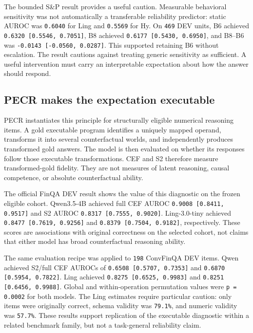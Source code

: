 \documentclass[11pt]{article}
\begin{document}
The bounded S\&P result provides a useful caution. Measurable behavioral sensitivity was not automatically a transferable reliability predictor: static AUROC was \texttt{0.6040} for Ling and \texttt{0.5569} for Hy. On \texttt{469} DEV units, B6 achieved \texttt{0.6320 [0.5546, 0.7051]}, B8 achieved \texttt{0.6177 [0.5430, 0.6950]}, and B8--B6 was \texttt{-0.0143 [-0.0560, 0.0287]}. This supported retaining B6 without escalation. The result cautions against treating generic sensitivity as sufficient. A useful intervention must carry an interpretable expectation about how the answer should respond.

\subsection{PECR makes the expectation executable}

PECR instantiates this principle for structurally eligible numerical reasoning items. A gold executable program identifies a uniquely mapped operand, transforms it into several counterfactual worlds, and independently produces transformed gold answers. The model is then evaluated on whether its responses follow those executable transformations. CEF and S2 therefore measure transformed-gold fidelity. They are not measures of latent reasoning, causal competence, or absolute counterfactual ability.

The official FinQA DEV result shows the value of this diagnostic on the frozen eligible cohort. Qwen3.5-4B achieved full CEF AUROC \texttt{0.9008 [0.8411, 0.9517]} and S2 AUROC \texttt{0.8317 [0.7555, 0.9020]}. Ling-3.0-tiny achieved \texttt{0.8477 [0.7619, 0.9256]} and \texttt{0.8379 [0.7504, 0.9182]}, respectively. These scores are associations with original correctness on the selected cohort, not claims that either model has broad counterfactual reasoning ability.

The same evaluation recipe was applied to \texttt{198} ConvFinQA DEV items. Qwen achieved S2/full CEF AUROCs of \texttt{0.6508 [0.5707, 0.7353]} and \texttt{0.6870 [0.5954, 0.7822]}. Ling achieved \texttt{0.8275 [0.6525, 0.9983]} and \texttt{0.8251 [0.6456, 0.9988]}. Global and within-operation permutation values were \texttt{p = 0.0002} for both models. The Ling estimates require particular caution: only  items were originally correct, schema validity was \texttt{79.1\%}, and numeric validity was \texttt{57.7\%}. These results support replication of the executable diagnostic within a related benchmark family, but not a task-general reliability claim.
\end{document}
